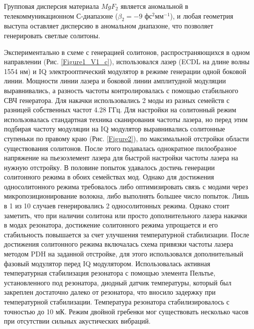 Групповая дисперсия материала $MgF_2$ является аномальной в телекоммуникационном С-диапазоне ($\beta_2=-9$ фс$^2$мм$^{-1}$), и любая геометрия выступа оставляет дисперсию в аномальном диапазоне, что позволяет генерировать светлые солитоны.

Экспериментально в схеме с генерацией солитонов, распространяющихся в одном направлении (Рис. \ref{Figure1_V1_c}), использовался лазер (ECDL на длине волны 1554 нм) и IQ электрооптический модулятор в режиме генерации одной боковой линии. Мощности линии лазера и боковой линии амплитудной модуляции выравнивались, а разность частоты контролировалась с помощью стабильного СВЧ генератора. Для накачки использовались 2 моды из разных семейств с разницей собственных частот 4.28 ГГц. Для настройки на солитонный режим использовалась стандартная техника сканирования частоты лазера, но перед этим подбирая частоту модуляции на IQ модулятор выравнивались солитонные ступеньки по правому краю (Рис. \ref{Figure2}), по максимальной отстройки области существования солитонов. После этого подавалась однократное пилообразное напряжение на пьезоэлемент лазера для быстрой настройки частоты лазера на нужную отстройку. В половине попыток удавалось достичь генерации солитонного режима в обоих семействах мод. Однако для достижения односолитонного режима требовалось либо оптимизировать связь с модами через микропозиционирование волокна, либо выполнять большее число попыток. Лишь в 1 из 10 случаев генерировались 2 односолитонных режима. Однако стоит заметить, что при наличии солитона или просто дополнительного лазера накачки в модах резонатора, достижение солитонного режима упрощается и его стабильность повышается за счет улучшения температурной стабилизации. После достижения солитонного режима включалась схема привязки частоты лазера методом PDH на заданной отстройке, для этого использовался дополнительный фазовый модулятор перед IQ модулятором. Использовалась активная температурная стабилизация резонатора с помощью элемента Пельтье, установленного под резонатора, диодный датчик температуры, который был закреплен достаточно далеко от резонатора, что вносило задержку при температурной стабилизации. Температура резонатора стабилизировалось с точностью до 10 мК. Режим двойной гребенки мог существовать несколько часов при отсутствии сильных акустических вибраций.

